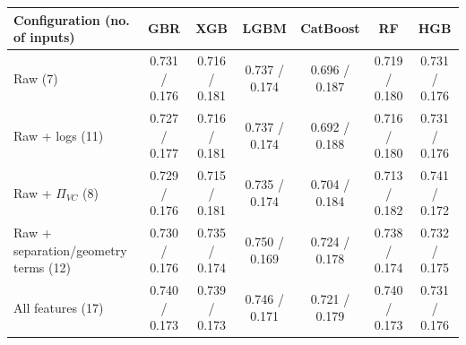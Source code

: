 \begin{tabular}{lcccccc}\toprule Configuration (no. of inputs) & GBR & XGB & LGBM & CatBoost & RF & HGB\\\midrule
Raw (7) & 0.731 / 0.176 & 0.716 / 0.181 & 0.737 / 0.174 & 0.696 / 0.187 & 0.719 / 0.180 & 0.731 / 0.176\\
Raw + logs (11) & 0.727 / 0.177 & 0.716 / 0.181 & 0.737 / 0.174 & 0.692 / 0.188 & 0.716 / 0.180 & 0.731 / 0.176\\
Raw + $\Pi_{VC}$ (8) & 0.729 / 0.176 & 0.715 / 0.181 & 0.735 / 0.174 & 0.704 / 0.184 & 0.713 / 0.182 & 0.741 / 0.172\\
Raw + separation/geometry terms (12) & 0.730 / 0.176 & 0.735 / 0.174 & 0.750 / 0.169 & 0.724 / 0.178 & 0.738 / 0.174 & 0.732 / 0.175\\
All features (17) & 0.740 / 0.173 & 0.739 / 0.173 & 0.746 / 0.171 & 0.721 / 0.179 & 0.740 / 0.173 & 0.731 / 0.176\\
\bottomrule\end{tabular}